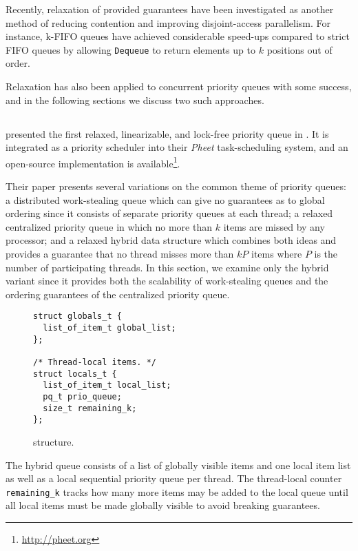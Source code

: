 Recently, relaxation of provided guarantees have been investigated as another method of reducing
contention and improving disjoint-access parallelism.
For instance, k-FIFO queues \cite{kirsch2012fast} have achieved considerable
speed-ups compared to strict FIFO queues by allowing {\lstset{breaklines,breakatwhitespace} \lstinline|Dequeue|} to return elements
up to $k$ positions out of order.

Relaxation has also been applied to concurrent priority queues with some success, and in the following
sections we discuss two such approaches.

\subsection{\citeauthor{wimmer2013data}} \label{sec:wimmer}

\citeauthor{wimmer2013data} presented the first relaxed, linearizable, and lock-free priority queue
in \cite{wimmer2013data}. It is integrated as a priority scheduler into their \emph{Pheet} task-scheduling
system, and an open-source implementation is available\footnote{\url{http://pheet.org}}.

Their paper presents several variations on the common theme of priority queues: a distributed work-stealing
queue which can give no guarantees as to global ordering since it consists of separate priority queues
at each thread; a relaxed centralized priority queue in which no more than $k$ items are missed
by any processor; and a relaxed hybrid data structure which combines both ideas and provides
a guarantee that no thread misses more than $kP$ items where $P$ is the number of participating threads.
In this section, we examine only the hybrid variant since it provides both the scalability of work-stealing
queues and the ordering guarantees of the centralized priority queue.

\begin{figure}[ht]
\begin{lstlisting}
struct globals_t {
  list_of_item_t global_list;
};

/* Thread-local items. */
struct locals_t {
  list_of_item_t local_list;
  pq_t prio_queue;
  size_t remaining_k;
};
\end{lstlisting}
\caption{\citeauthor{wimmer2013data} structure.}
\label{fig:wimmerq}
\end{figure}

The hybrid queue consists of a list of globally visible items and one local item list as well as a local
sequential priority queue per thread. The thread-local counter \lstinline|remaining_k| tracks how many more
items may be added to the local queue until all local items must be made globally visible to avoid
breaking guarantees.

